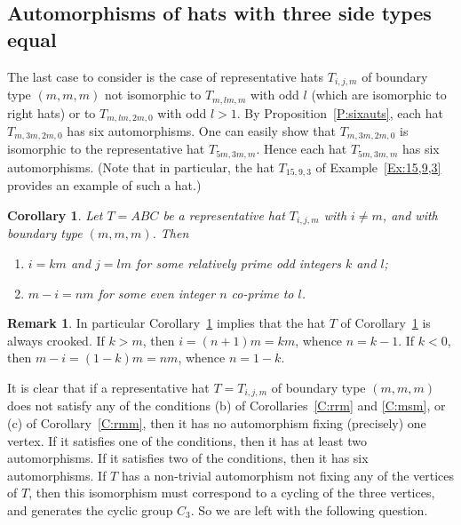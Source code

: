 \documentclass[12pt]{amsart}
\theoremstyle{plain}
\newtheorem{corollary}[theorem]{Corollary}
\theoremstyle{definition}
\newtheorem{remark}[theorem]{Remark}
\numberwithin{equation}{section}
\begin{document}
\subsection{Automorphisms of hats with three side types equal}


The last case to consider is the case of representative hats $T_{i,j,m}$ of boundary type
$(m,m,m)$ not isomorphic to $T_{m,lm,m}$ with odd $l$ (which are isomorphic to right hats) or to $T_{m,lm,2m,0}$ with odd $l > 1$. By Proposition~\ref{P:sixauts}, each hat $T_{m,3m,2m,0}$ has six automorphisms.
One can easily show that $T_{m,3m,2m,0}$ is isomorphic to the representative hat $T_{5m,3m,m}$.
Hence each hat $T_{5m,3m,m}$ has six automorphisms. (Note that in particular, the hat
$T_{15,9,3}$ of Example~\ref{Ex:15,9,3} provides an example of such a hat.)



\begin{corollary}\label{C:mmm}
Let $T = ABC$ be a representative hat $T_{i,j,m}$ with $i \neq m$, and with boundary type
$(m,m,m)$. Then
\begin{enumerate}
\item[(a)] $i = km$ and $j = lm$ for some relatively prime odd integers $k$ and $l$;
\item[(b)] $m - i = nm$ for some even integer $n$ co-prime to $l$.
\end{enumerate}
\end{corollary}



\begin{remark}\label{R:mmm}
In particular Corollary~\ref{C:mmm} implies that the hat $T$ of Corollary~\ref{C:mmm} is always crooked. If $k > m$, then $i = (n+1)m = km$, whence $n = k-1$. If $k < 0$, then $m-i = (1-k)m = nm$, whence $n = 1-k$.
\end{remark}


It is clear that if a representative hat $T = T_{i,j,m}$ of boundary type $(m,m,m)$ does not
satisfy any of the conditions (b) of Corollaries~\ref{C:rrm} and \ref{C:msm}, or (c) of
Corollary~\ref{C:rmm}, then it has no automorphism fixing (precisely) one vertex. If it
satisfies one of the conditions, then it has at least two automorphisms. If it satisfies two of the conditions, then it has six automorphisms. If $T$ has a non-trivial automorphism not fixing any of the vertices of $T$, then this   isomorphism must correspond to a cycling of the three vertices, and generates the cyclic group $C_3$. So we are left with the following question.
\end{document}
